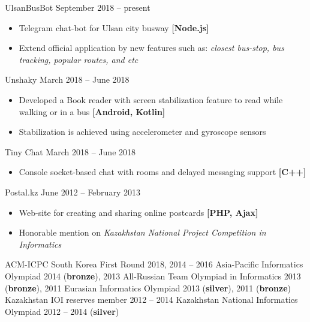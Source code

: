 
\cvevent
    {UlsanBusBot}
    {}
    {September 2018 -- present}{}
\begin{itemize}
\item Telegram chat-bot for Ulsan city busway
    \textbf{[Node.js]}
\item Extend official application by new features such as:
    \textit{closest bus-stop, bus tracking, popular routes, and etc}
\end{itemize}
\divider



\cvevent
    {Unshaky}
    {}
    {March 2018 -- June 2018}{}
\begin{itemize}
\item Developed a Book reader with screen stabilization feature to read while walking or in a bus
    \textbf{[Android, Kotlin]}
\item Stabilization is achieved using accelerometer and gyroscope sensors
\end{itemize}
\divider



\cvevent
    {Tiny Chat}
    {}
    {March 2018 -- June 2018}{}
\begin{itemize}
\item Console socket-based chat with rooms and delayed messaging support 
    \textbf{[C++]}
\end{itemize}
\divider




\cvevent
    {Postal.kz}
    {}
    {June 2012 -- February 2013}{}
\begin{itemize}
\item Web-site for creating and sharing online postcards 
    \textbf{[PHP, Ajax]}
\item Honorable mention on 
    \textit{Kazakhstan National Project Competition in Informatics}
\end{itemize}





\cvachievement
    {}
    {ACM-ICPC South Korea First Round}
    {2018, 2014 -- 2016}
\cvachievement
    {\faTrophy}
    {Asia-Pacific Informatics Olympiad}
    {2014 (\textbf{bronze}), 2013}
\cvachievement
    {\faTrophy}
    {All-Russian Team Olympiad in Informatics}
    {2013 (\textbf{bronze}), 2011}
\cvachievement
    {\faTrophy}
    {Eurasian Informatics Olympiad}
    {2013 (\textbf{silver}), 2011 (\textbf{bronze})}
\cvachievement
    {}
    {Kazakhstan IOI reserves member}
    {2012 -- 2014}
\cvachievement
    {\faTrophy}
    {Kazakhstan National Informatics Olympiad}
    {2012 -- 2014 (\textbf{silver})}